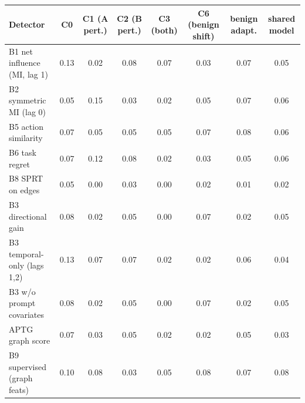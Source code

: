 \begin{tabular}{lccccccc}
\toprule
Detector & C0 & C1 (A pert.) & C2 (B pert.) & C3 (both) & C6 (benign shift) & benign adapt. & shared model \\
\midrule
B1 net influence (MI, lag 1) & 0.13 & 0.02 & 0.08 & 0.07 & 0.03 & 0.07 & 0.05 \\
B2 symmetric MI (lag 0) & 0.05 & 0.15 & 0.03 & 0.02 & 0.05 & 0.07 & 0.06 \\
B5 action similarity & 0.07 & 0.05 & 0.05 & 0.05 & 0.07 & 0.08 & 0.06 \\
B6 task regret & 0.07 & 0.12 & 0.08 & 0.02 & 0.03 & 0.05 & 0.06 \\
B8 SPRT on edges & 0.05 & 0.00 & 0.03 & 0.00 & 0.02 & 0.01 & 0.02 \\
B3 directional gain & 0.08 & 0.02 & 0.05 & 0.00 & 0.07 & 0.02 & 0.05 \\
B3 temporal-only (lags 1,2) & 0.13 & 0.07 & 0.07 & 0.02 & 0.02 & 0.06 & 0.04 \\
B3 w/o prompt covariates & 0.08 & 0.02 & 0.05 & 0.00 & 0.07 & 0.02 & 0.05 \\
APTG graph score & 0.07 & 0.03 & 0.05 & 0.02 & 0.02 & 0.05 & 0.03 \\
B9 supervised (graph feats) & 0.10 & 0.08 & 0.03 & 0.05 & 0.08 & 0.07 & 0.08 \\
\bottomrule
\end{tabular}